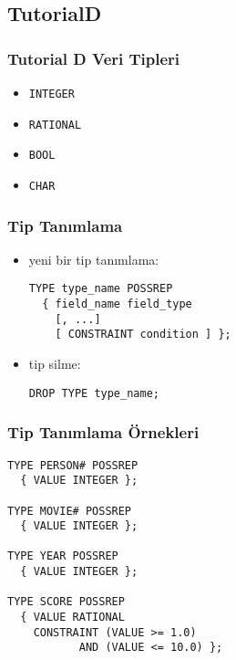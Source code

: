 \documentclass[dvipsnames]{beamer}
\theoremstyle{plain}
\begin{document}
\subsection{TutorialD}

\begin{frame}
  \frametitle{Tutorial D Veri Tipleri}

  \begin{itemize}
    \item \texttt{INTEGER}
    \item \texttt{RATIONAL}
    \item \texttt{BOOL}
    \item \texttt{CHAR}
  \end{itemize}
\end{frame}

\begin{frame}[fragile]
  \frametitle{Tip Tanımlama}

  \begin{itemize}
    \item yeni bir tip tanımlama:
    \begin{lstlisting}
TYPE type_name POSSREP
  { field_name field_type
    [, ...]
    [ CONSTRAINT condition ] };
    \end{lstlisting}

    \item tip silme:
    \begin{lstlisting}
DROP TYPE type_name;
    \end{lstlisting}
  \end{itemize}
\end{frame}

\begin{frame}[fragile]
  \frametitle{Tip Tanımlama Örnekleri}

  \begin{lstlisting}
TYPE PERSON# POSSREP
  { VALUE INTEGER };

TYPE MOVIE# POSSREP
  { VALUE INTEGER };

TYPE YEAR POSSREP
  { VALUE INTEGER };

TYPE SCORE POSSREP
  { VALUE RATIONAL
    CONSTRAINT (VALUE >= 1.0)
           AND (VALUE <= 10.0) };
  \end{lstlisting}
\end{frame}
\end{document}
